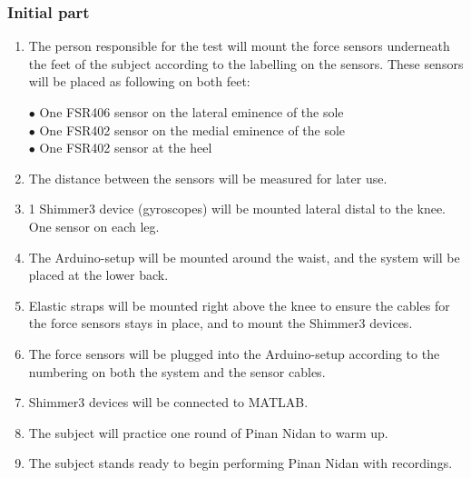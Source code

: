 \subsubsection{Initial part}
\begin{enumerate}
\item The person responsible for the test will mount the force sensors underneath the feet of the subject according to the labelling on the sensors. These sensors will be placed as following on both feet:
\begin{itemize}
$\bullet$ One FSR406 sensor on the lateral eminence of the sole \\
$\bullet$ One FSR402 sensor on the medial eminence of the sole \\
$\bullet$ One FSR402 sensor at the heel \\
\end{itemize}
\item The distance between the sensors will be measured for later use. 
\item 1 Shimmer3 device (gyroscopes) will be mounted lateral distal to the knee. One sensor on each leg.
\item The Arduino-setup will be mounted around the waist, and the system will be placed at the lower back.
\item Elastic straps will be mounted right above the knee to ensure the cables for the force sensors stays in place, and to mount the Shimmer3 devices.
\item The force sensors will be plugged into the Arduino-setup according to the numbering on both the system and the sensor cables.
\item Shimmer3 devices will be connected to MATLAB.
\item The subject will practice one round of Pinan Nidan to warm up.
\item The subject stands ready to begin performing Pinan Nidan with recordings.
\end{enumerate}

